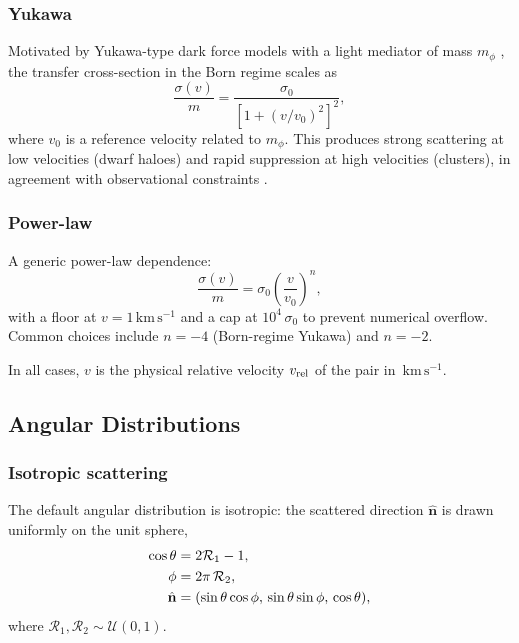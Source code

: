 \documentclass[fleqn,usenatbib]{mnras}
\newcommand{\vrel}{v_{\rm rel}}
\newcommand{\kms}{\,\mathrm{km\,s^{-1}}}
\begin{document}
\subsubsection{Yukawa}
Motivated by Yukawa-type dark force models with a light mediator of
mass $m_\phi$ \citep{Feng2009,Tulin2013}, the transfer cross-section
in the Born regime scales as
\begin{equation}
\frac{\sigma(v)}{m} = \frac{\sigma_0}{\left[1 + (v/v_0)^2\right]^2},
\label{eq:sigma_yukawa}
\end{equation}
where $v_0$ is a reference velocity related to $m_\phi$.  This
produces strong scattering at low velocities (dwarf haloes) and
rapid suppression at high velocities (clusters), in agreement with
observational constraints \citep{Kaplinghat2016}.

\subsubsection{Power-law}
A generic power-law dependence:
\begin{equation}
\frac{\sigma(v)}{m} = \sigma_0\left(\frac{v}{v_0}\right)^n,
\label{eq:sigma_power}
\end{equation}
with a floor at $v = 1\kms$ and a cap at $10^4\,\sigma_0$ to prevent
numerical overflow.  Common choices include $n = -4$ (Born-regime
Yukawa) and $n = -2$.

In all cases, $v$ is the physical relative velocity $\vrel$ of the
pair in $\kms$.

\subsection{Angular Distributions}
\label{sec:sidm_angular}

\subsubsection{Isotropic scattering}
\label{sec:sidm_isotropic}

The default angular distribution is isotropic: the scattered
direction $\hat{\mathbf{n}}$ is drawn uniformly on the unit sphere,
\begin{align}
\cos\theta &= 2\mathcal{R}_1 - 1, \notag\\
\phi &= 2\pi\,\mathcal{R}_2, \notag\\
\hat{\mathbf{n}} &= (\sin\theta\cos\phi,\,
  \sin\theta\sin\phi,\,\cos\theta),
\label{eq:isotropic}
\end{align}
where $\mathcal{R}_1, \mathcal{R}_2 \sim \mathcal{U}(0,1)$.
\end{document}
